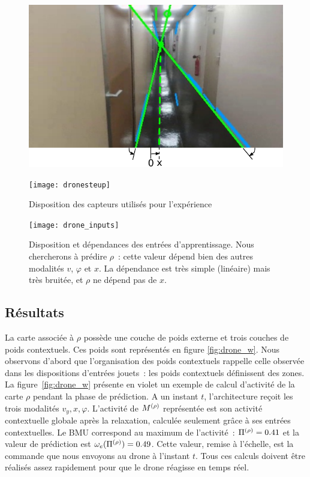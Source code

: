 \documentclass[../main]{subfiles}
\begin{document}
\begin{figure}
	\begin{minipage}{0.5\textwidth}
	\includegraphics[width=\textwidth]{visudrone.pdf}
	\end{minipage}
	\begin{minipage}{0.5\textwidth}
	\texttt{[image: dronesteup]}
	\end{minipage}
	\caption{Disposition des capteurs utilisés pour l'expérience}
	\label{fig:drone}
	\end{figure}

\begin{figure}
	\centering\texttt{[image: drone\_inputs]}
	\caption{Disposition et dépendances des entrées d'apprentissage. Nous chercherons à prédire $\rho$~: cette valeur dépend bien des autres modalités $v$, $\varphi$ et $x$. La dépendance est très simple (linéaire) mais très bruitée, et $\rho$ ne dépend pas de $x$. \label{fig:drone_inp}}
\end{figure}


\subsection{Résultats}

La carte associée à $\rho$ possède une couche de poids externe et trois couches de poids contextuels. 
Ces poids sont représentés en figure \ref{fig:drone_w}. 
Nous observons d'abord que l'organisation des poids contextuels rappelle celle observée dans les dispositions d'entrées jouets~: les poids contextuels définissent des zones. 
La figure~\ref{fig:drone_w} présente en violet un exemple de calcul d'activité de la carte $\rho$ pendant la phase de prédiction.
A un instant $t$, l'architecture reçoit les trois modalités $v_y, x, \varphi$.
L'activité de $M^{({\rho})}$ représentée est son activité contextuelle globale après la relaxation, calculée seulement grâce à ses entrées contextuelles.
Le BMU correspond au maximum de l'activité~: $\Pi^{({\rho})} = 0.41$ et la valeur de prédiction est $\omega_e(\Pi^{({\rho})}) = 0.49$. Cette valeur, remise à l'échelle, est la commande que nous envoyons au drone à l'instant $t$.
Tous ces calculs doivent être réalisés assez rapidement pour que le drone réagisse en temps réel.
\end{document}

